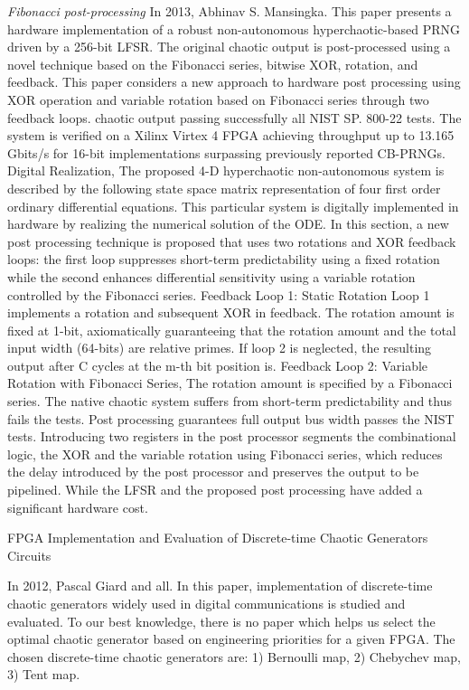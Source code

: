 \textit{Fibonacci post-processing} In 2013, Abhinav S. Mansingka. This paper presents a hardware implementation of a robust non-autonomous hyperchaotic-based PRNG driven by a 256-bit LFSR. The original chaotic output is post-processed using a novel technique based on the Fibonacci series, bitwise XOR, rotation, and feedback. This paper considers a new approach to hardware post processing using XOR operation and variable rotation based on Fibonacci series through two feedback loops. chaotic output passing successfully all NIST SP. 800-22 tests. The system is verified on a Xilinx Virtex 4 FPGA achieving throughput up to 13.165 Gbits/s for 16-bit implementations surpassing previously reported CB-PRNGs.  Digital Realization, The proposed 4-D hyperchaotic non-autonomous system is described by the following state space matrix representation of four first order ordinary differential equations. This particular system is digitally implemented in hardware by realizing the numerical solution of the ODE. In this section, a new post processing technique is proposed that uses two rotations and XOR feedback loops: the first loop suppresses short-term predictability using a fixed rotation while the second enhances differential sensitivity using a variable rotation controlled by the Fibonacci series. Feedback Loop 1: Static Rotation Loop 1 implements a rotation and subsequent XOR in feedback. The rotation amount is fixed at 1-bit, axiomatically guaranteeing that the rotation amount and the total input width (64-bits) are relative primes. If loop 2 is neglected, the resulting output after C cycles at the m-th bit position is. Feedback Loop 2: Variable Rotation with Fibonacci Series,  The rotation amount is specified by a Fibonacci series. The native chaotic system suffers from short-term predictability and thus fails the tests. Post processing guarantees full output bus width passes the NIST tests.  Introducing two registers in the post processor segments the combinational logic, the XOR and the variable rotation using Fibonacci series, which reduces the delay introduced by the post processor and preserves the output to be pipelined. While the LFSR and the proposed post processing have added a significant hardware cost.

FPGA Implementation and Evaluation of Discrete-time Chaotic Generators Circuits

In 2012, Pascal Giard and all. In this paper, implementation of discrete-time chaotic generators widely used in digital communications is studied and evaluated. To our best knowledge, there is no paper which helps us select the optimal chaotic generator based on engineering priorities for a given FPGA. The chosen discrete-time chaotic generators are: 1) Bernoulli map, 2) Chebychev map, 3) Tent map. 



